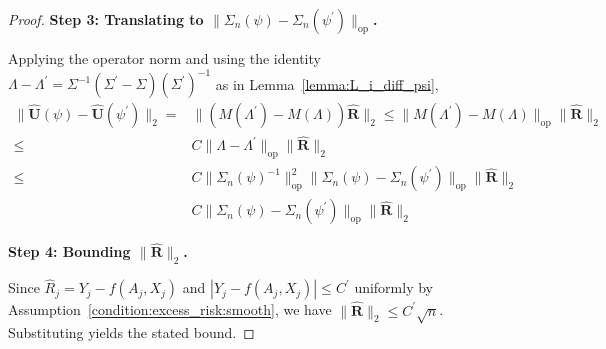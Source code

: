 \begin{proof}
\noindent\textbf{Step 3: Translating to $\|\Sigma_n(\psi)-\Sigma_n(\psi^\prime)\|_{\mathrm{op}}$.}

Applying the operator norm and using the identity $\Lambda-\Lambda^\prime=\Sigma^{-1}(\Sigma^\prime-\Sigma)(\Sigma^\prime)^{-1}$ as in Lemma~\ref{lemma:L_i_diff_psi},
\begin{align*}
\|\widehat{\mathbf{U}}(\psi)-\widehat{\mathbf{U}}(\psi^\prime)\|_2
= &\|(M(\Lambda^\prime)-M(\Lambda))\widehat{\mathbf{R}}\|_2
\leq \|M(\Lambda^\prime)-M(\Lambda)\|_{\mathrm{op}}\|\widehat{\mathbf{R}}\|_2\\
\leq & C\|\Lambda-\Lambda^\prime\|_{\mathrm{op}}\|\widehat{\mathbf{R}}\|_2\\
\leq &C\|\Sigma_n(\psi)^{-1}\|_{\mathrm{op}}^2\|\Sigma_n(\psi)-\Sigma_n(\psi^\prime)\|_{\mathrm{op}}\|\widehat{\mathbf{R}}\|_2\\
& C \|\Sigma_n(\psi)-\Sigma_n(\psi^\prime)\|_{\mathrm{op}}\|\widehat{\mathbf{R}}\|_2
\end{align*}

\noindent\textbf{Step 4: Bounding $\|\widehat{\mathbf{R}}\|_2$.}

Since $\widehat{R}_j=Y_j-f(A_j,X_j)$ and $|Y_j-f(A_j,X_j)|\leq C^\prime$ uniformly by Assumption~\ref{condition:excess_risk:smooth}, we have $\|\widehat{\mathbf{R}}\|_2\leq C^\prime\sqrt{n}$.  Substituting yields the stated bound.
\end{proof}